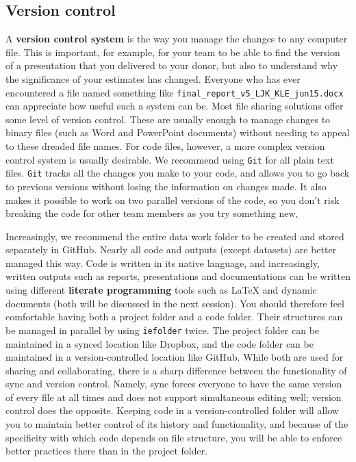 \subsection{Version control}

A \textbf{version control system} is the way you manage the changes to any computer file.
This is important, for example, for your team to be able to find the version of a presentation that you delivered to your donor,
but also to understand why the significance of your estimates has changed.
Everyone who has ever encountered a file named something like  \texttt{final\_report\_v5\_LJK\_KLE\_jun15.docx}
can appreciate how useful such a system can be.
Most file sharing solutions offer some level of version control.
These are usually enough to manage changes to binary files (such as Word and PowerPoint documents) without needing to appeal to these dreaded file names.
For code files, however, a more complex version control system is usually desirable.
We recommend using \texttt{Git} for all plain text files. 
\texttt{Git} tracks all the changes you make to your code, 
and allows you to go back to previous versions without losing the information on changes made. 
It also makes it possible to work on two parallel versions of the code, 
so you don't risk breaking the code for other team members as you try something new,

Increasingly, we recommend the entire data work folder
to be created and stored separately in GitHub.
Nearly all code and outputs (except datasets) are better managed this way. 
Code is written in its native language,
and increasingly, written outputs such as reports,
presentations and documentations can be written using different \textbf{literate programming}
tools such as {\LaTeX} and dynamic documents (both will be discussed in the next session).
You should therefore feel comfortable having both a project folder and a code folder.
Their structures can be managed in parallel by using \texttt{iefolder} twice.
The project folder can be maintained in a synced location like Dropbox,
and the code folder can be maintained in a version-controlled location like GitHub.
While both are used for sharing and collaborating,
there is a sharp difference between the functionality of sync and version control.
Namely, sync forces everyone to have the same version of every file at all times
and does not support simultaneous editing well; version control does the opposite.
Keeping code in a version-controlled folder will allow you
to maintain better control of its history and functionality,
and because of the specificity with which code depends on file structure,
you will be able to enforce better practices there than in the project folder.

